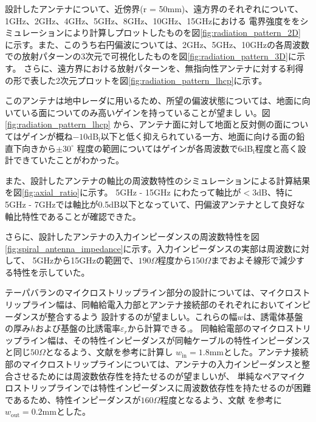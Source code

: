 \documentclass[11pt,a4paper,uplatex]{ujarticle}
\begin{document}
  設計したアンテナについて、近傍界(r = 50mm)、遠方界のそれぞれについて、1GHz、2GHz、4GHz、5GHz、8GHz、10GHz、15GHzにおける
  電界強度ををシミュレーションにより計算しプロットしたものを図\ref{fig:radiation_pattern_2D}
  に示す。また、このうち右円偏波については、2GHz、5GHz、10GHzの各周波数での放射パターンの3次元で可視化したものを図\ref{fig:radiation_pattern_3D}に示す。
  さらに、遠方界における放射パターンを、無指向性アンテナに対する利得の形で表した2次元プロットを図\ref{fig:radiation_pattern_lhcp}に示す。

  このアンテナは地中レーダに用いるため、所望の偏波状態については、地面に向いている面についてのみ高いゲインを持っていることが望まし
  い。図\ref{fig:radiation_pattern_lhcp}
  から、アンテナ面に対して地面と反対側の面についてはゲインが概ね$-10\mathrm{dB_i}$以下と低く抑えられている一方、地面に向ける面の鉛直下向きから$\displaystyle \pm 30^{\circ}$
  程度の範囲についてはゲインが各周波数で$6\mathrm{dB_i}$程度と高く設計できていたことがわかった。

  また、設計したアンテナの軸比の周波数特性のシミュレーションによる計算結果を図\ref{fig:axial_ratio}に示す。
  5GHz - 15GHz にわたって軸比が$<3\mathrm{dB}$、特に5GHz - 7GHzでは軸比が0.5dB以下となっていて、円偏波アンテナとして良好な軸比特性であることが確認できた。

  さらに、設計したアンテナの入力インピーダンスの周波数特性を図\ref{fig:spiral_antenna_impedance}に示す。入力インピーダンスの実部は周波数に対して、
  5GHzから15GHzの範囲で、$190\Omega$程度から$150\Omega$までおよそ線形で減少する特性を示していた。

  テーパバランのマイクロストリップライン部分の設計については、マイクロストリップライン幅は、同軸給電入力部とアンテナ接続部のそれぞれにおいてインピーダンスが整合するよう
  設計するのが望ましい。これらの幅$w$は、誘電体基盤の厚み$h$および基盤の比誘電率$\varepsilon_r$から計算できる\cite{ground_microstrip_line},\cite{pair_microstrip_line}。
  同軸給電部のマイクロストリップライン幅は、その特性インピーダンスが同軸ケーブルの特性インピーダンスと同じ$50\Omega$となるよう、文献\cite{ground_microstrip_line}を参考に計算し
  $w_{\mathrm{in}} = 1.8\mathrm{mm}$とした。アンテナ接続部のマイクロストリップラインについては、アンテナの入力インピーダンスと整合させるためには周波数依存性を持たせるのが望ましいが、
  単純なペアマイクロストリップラインでは特性インピーダンスに周波数依存性を持たせるのが困難であるため、特性インピーダンスが$160\Omega$程度となるよう、文献\cite{pair_microstrip_line}
  を参考に$w_{\mathrm{out}} = 0.2\mathrm{mm}$とした。
\end{document}

